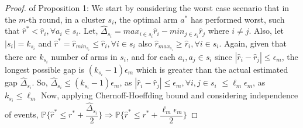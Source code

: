 \begin{proof} of Proposition 1:
\newline
We start by considering the worst case scenario that in the $m$-th round, in a cluster $s_{i}$, the optimal arm $a^{*}$ has performed worst, such that $\hat{r}^{*}<\hat{r}_{i},\forall a_{i} \in s_{i}$. Let, $\hat{\Delta}_{s_{i}}=max_{i\in s_{i}}\hat{r}_{i}-min_{j\in s_{i}}\hat{r}_{j}$ where $i\neq j$. Also, let $|s_{i}|=k_{s_{i}}$ and $\hat{r}^{*}=\hat{r}_{min_{s_{i}}}\leq\hat{r}_{i},\forall i\in s_{i}$ also $\hat{r}_{max_{s_{i}}}\geq\hat{r}_{i},\forall i\in s_{i}$.
\newline
Again, given that there are $k_{s_{i}}$ number of arms in $s_{i}$, and for each $a_{i},a_{j}\in s_{i}$ since $|\hat{r}_{i}-\hat{r}_{j}|\leq\epsilon_{m}$, the longest possible gap is $(k_{s_{i}}-1)\epsilon_{m}$ which is greater than the actual estimated gap $\hat{\Delta}_{s_{i}}$.
\newline
So, $\hat{\Delta}_{s_{i}}\leq (k_{s_{i}}-1)\epsilon_{m}$, as $|\hat{r}_{i}-\hat{r}_{j}|\leq\epsilon_{m}, \forall i,j \in s_{i}$
\newline\hspace*{3.5em}$\leq \ell_{m}\epsilon_{m}$, as $k_{s_{i}}\leq \ell_{m}$
\newline Now, applying Chernoff-Hoeffding bound and considering independence of events,
\newline $\mathbb{P}\lbrace\hat{r}^{*}\leq{r}^{*} + \dfrac{\hat{\Delta}_{s_{i}}}{2}\rbrace\Rightarrow \mathbb{P}\lbrace\hat{r}^{*}\leq{r}^{*} + \dfrac{\ell_{m}\epsilon_{m}}{2}\rbrace $

\end{proof}

